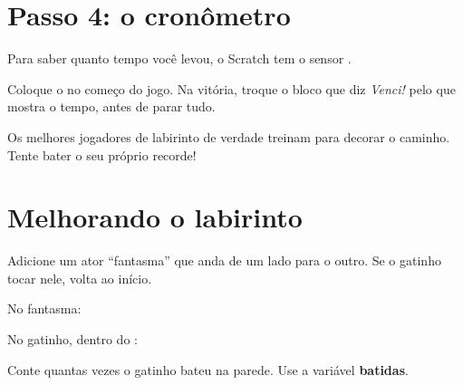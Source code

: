 \section{Passo 4: o cronômetro}

Para saber quanto tempo você levou, o Scratch tem o sensor .

\begin{codigo}
\begin{pilha}
\end{pilha}
\end{codigo}

Coloque o  no começo do jogo. Na vitória, troque o bloco que diz \emph{Venci!} pelo que mostra o tempo, antes de parar tudo.

\begin{curiosidade}
Os melhores jogadores de labirinto de verdade treinam para decorar o caminho. Tente bater o seu próprio recorde!
\end{curiosidade}

\section{Melhorando o labirinto}

\begin{exercicio}
Adicione um ator ``fantasma'' que anda de um lado para o outro. Se o gatinho tocar nele, volta ao início.
\end{exercicio}

\begin{solucao}
No fantasma:
\begin{pilha}
\sbcend
\end{pilha}
No gatinho, dentro do :
\begin{pilha}
\sbcend
\end{pilha}
\end{solucao}

\begin{exercicio}
Conte quantas vezes o gatinho bateu na parede. Use a variável \textbf{batidas}.
\end{exercicio}

